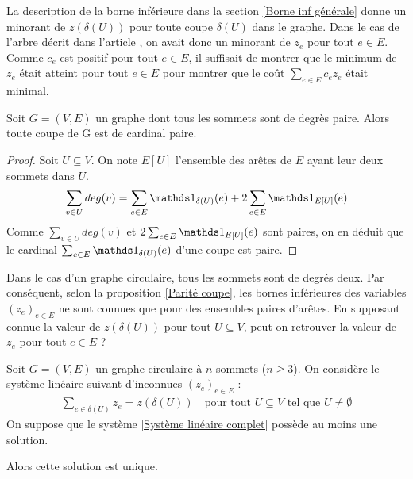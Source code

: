 La description de la borne inférieure dans la section \ref{Borne inf générale} donne un minorant de $z(\delta(U))$ pour toute coupe $\delta(U)$ dans le graphe. Dans le cas de l'arbre décrit dans l'article \cite{Benchimol2011}, on avait donc un minorant de $z_e$ pour tout $e \in E$. Comme $c_e$ est positif pour tout $e\in E$, il suffisait de montrer que le minimum de $z_e$ était atteint pour tout $e \in E$ pour montrer que le coût $\sum_{e \in E}c_ez_e$ était minimal.

\begin{prop}\label{Parité coupe}
Soit $G=(V,E)$ un graphe dont tous les sommets sont de degrès paire. Alors toute coupe de G est de cardinal paire.
\end{prop}

\begin{proof}
Soit $U \subseteq V$. On note $E[U]$ l'ensemble des arêtes de $E$ ayant leur deux sommets dans $U$.
$$
\sum_{v \in U} deg(v) = \sum_{e \in E}\Indic_{\delta(U)}(e)  + 2 \sum_{e \in E}\Indic_{E[U]}(e)
$$
Comme $\sum_{v \in U} deg(v)$ et $2 \sum_{e \in E}\Indic_{E[U]}(e)$ sont paires, on en déduit que le cardinal $\sum_{e \in E}\Indic_{\delta(U)}(e)$ d'une coupe est paire.
\end{proof}

Dans le cas d'un graphe circulaire, tous les sommets sont de degrés deux. Par conséquent, selon la proposition \ref{Parité coupe}, les bornes inférieures des variables $(z_e)_{e \in E}$ ne sont connues que pour des ensembles paires d'arêtes. En supposant connue la valeur de $z(\delta(U))$ pour tout $U \subseteq V$, peut-on retrouver la valeur de $z_e$ pour tout $e \in E$ ?

\begin{lem}\label{Changement de base}
Soit $G=(V,E)$ un graphe circulaire à $n$ sommets ($n \ge 3$). On considère le système linéaire suivant d'inconnues $(z_e)_{e \in E}$ :
\begin{gather}\label{Système linéaire complet}
  \sum_{e \in \delta(U)}z_e = z(\delta(U)) \quad \mbox{pour tout } U \subseteq V \mbox{ tel que } U \ne \emptyset
\end{gather}
On suppose que le système \eqref{Système linéaire complet} possède au moins une solution.

Alors cette solution est unique.
\end{lem}

